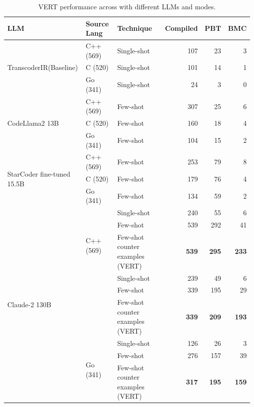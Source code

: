 \documentclass[12pt,openany,oneside,table]{cmuthesis}
\begin{document}
\begin{table}[t!]
\caption{\small VERT performance across with different LLMs and modes.}
\begin{tabular}{l|lp{3cm}rrr}
\toprule
 \textbf{LLM} &  \textbf{Source Lang} & \textbf{Technique} & \textbf{Compiled} & \textbf{PBT} & \textbf{BMC} \\
\midrule

\multirow{3}{*}{TranscoderIR(Baseline)}
& C++ (569)
& Single-shot             & 107  & 23 & 3  \\
\cmidrule{2-6}
& C (520)
& Single-shot             & 101  & 14 & 1  \\
\cmidrule{2-6}
& Go (341)
& Single-shot             & 24  & 3 & 0  \\
\midrule

\multirow{3}{*}{CodeLlama2 13B}
& C++ (569)
& Few-shot    & 307  & 25 & 6  \\
\cmidrule{2-6}
& C (520)
& Few-shot    & 160 & 18 & 4  \\
\cmidrule{2-6}
& Go (341)
& Few-shot     & 104 & 15 & 2 \\
\midrule

\multirow{3}{*}{StarCoder fine-tuned 15.5B}
& C++ (569)
& Few-shot              & 253  & 79 & 8  \\
\cmidrule{2-6}
& C (520)
& Few-shot     & 179 & 76 & 4  \\
\cmidrule{2-6}
& Go (341)
& Few-shot     & 134 & 59 & 2  \\
\midrule
\multirow{9}{*}{Claude-2 130B}
& \multirow{4}{*}{C++ (569)}
& Single-shot            & 240  & 55 & 6  \\
& & Few-shot     & 539 & 292 & 41  \\
& & Few-shot  counter examples  (VERT) & \textbf{539} & \textbf{295} & \textbf{233} \\
\cmidrule{2-6}

& \multirow{4}{*}{C (520)}
& Single-shot            & 239  & 49 & 6  \\
& & Few-shot     & 339 & 195 & 29  \\
& & Few-shot  counter examples (VERT) & \textbf{339} & \textbf{209} & \textbf{193}  \\
\cmidrule{2-6}

& \multirow{4}{*}{Go (341)}
& Single-shot             & 126  & 26 & 3  \\
& & Few-shot      & 276 & 157 & 39  \\
& & Few-shot  counter examples (VERT) & \textbf{317} & \textbf{195} & \textbf{159}  \\
\bottomrule
\end{tabular}
\label{table:results}
\end{table}
\end{document}
